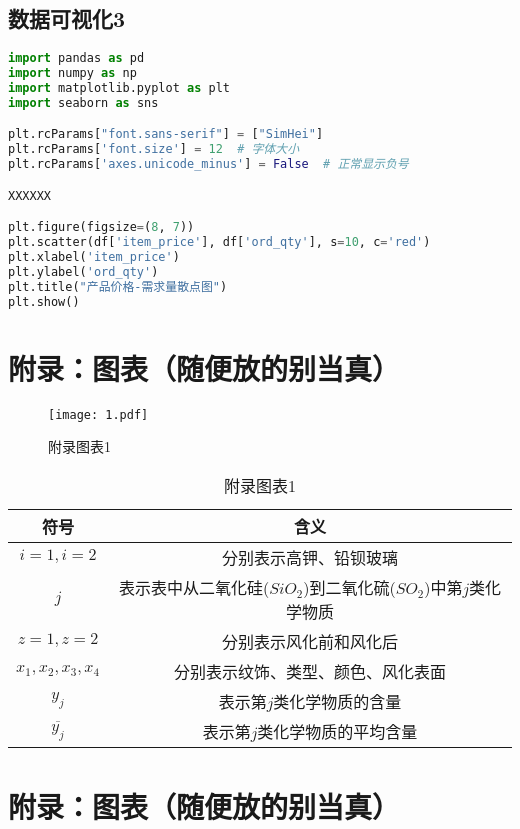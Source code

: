 \subsection{数据可视化3}


\begin{lstlisting}[language=Python]
import pandas as pd
import numpy as np
import matplotlib.pyplot as plt
import seaborn as sns

plt.rcParams["font.sans-serif"] = ["SimHei"]
plt.rcParams['font.size'] = 12  # 字体大小
plt.rcParams['axes.unicode_minus'] = False  # 正常显示负号

XXXXXX

plt.figure(figsize=(8, 7))
plt.scatter(df['item_price'], df['ord_qty'], s=10, c='red')
plt.xlabel('item_price')
plt.ylabel('ord_qty')
plt.title("产品价格-需求量散点图")
plt.show()
\end{lstlisting}


\section{附录：图表（随便放的别当真）}

\begin{figure}[H] 
	\centering 
	\texttt{[image: 1.pdf]} 
	\caption{附录图表1} 
	\label{fig300} 
\end{figure}


\begin{table}[H]
	\centering
	\caption{附录图表1}
	\begin{tabular}{c c}
		\toprule[1.5pt]
		符号 & 含义  \\ 
		\midrule[1pt]
		$i=1,i=2$ & 分别表示高钾、铅钡玻璃 \\ 
		$j$ & 表示表中从二氧化硅($SiO_2$)到二氧化硫($SO_2$)中第$j$类化学物质 \\
		$z=1,z=2$ & 分别表示风化前和风化后 \\
		$x_1,x_2,x_3,x_4$ & 分别表示纹饰、类型、颜色、风化表面 \\
		$y_j$ & 表示第$j$类化学物质的含量 \\ 
		$\overline{y_j}$ & 表示第$j$类化学物质的平均含量 \\  
		\toprule[1.5pt]
	\end{tabular}
\end{table} 


\section{附录：图表（随便放的别当真）}

